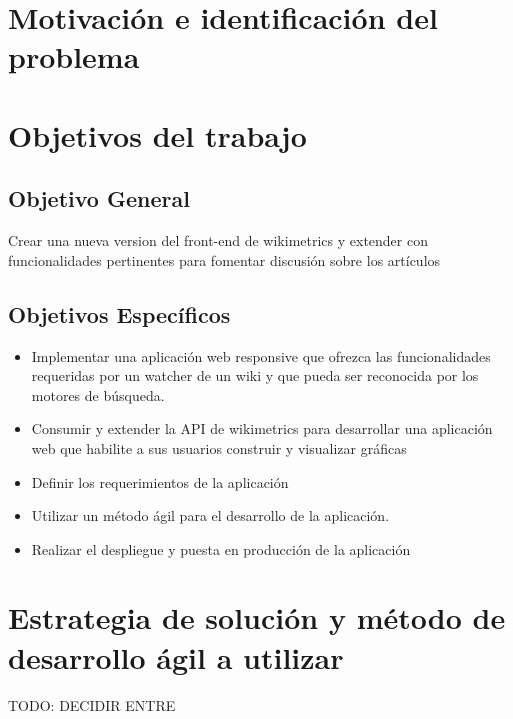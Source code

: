 

\section{Motivación e identificación del problema}

\section{Objetivos del trabajo}

\subsection{Objetivo General}

Crear una nueva version del front-end de wikimetrics y extender con funcionalidades pertinentes para fomentar discusión sobre los artículos

\subsection{Objetivos Específicos}


\begin{itemize}
    \item Implementar una aplicación web responsive que ofrezca las funcionalidades requeridas por un watcher de un wiki y que pueda ser reconocida por los motores de búsqueda.
    \item Consumir y extender la API de wikimetrics para desarrollar una aplicación web que habilite a sus usuarios construir y visualizar gráficas
    \item Definir los requerimientos de la aplicación
    \item Utilizar un método ágil para el desarrollo de la aplicación.
    \item Realizar el despliegue y puesta en producción de la aplicación
\end{itemize}

\section{Estrategia de solución y método de desarrollo ágil a utilizar}

TODO: DECIDIR ENTRE

